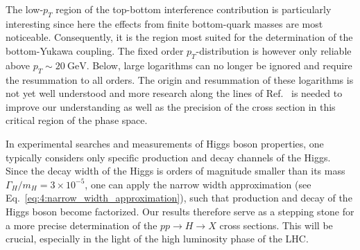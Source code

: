 The low-$p_T$ region of the top-bottom interference contribution is particularly interesting since here the effects from finite bottom-quark masses are most noticeable. Consequently, it is the region most suited for the determination of the bottom-Yukawa coupling. The fixed order $p_T$-distribution is however only reliable above $p_T \sim 20 \ \mathrm{GeV}$. Below, large logarithms can no longer be ignored and require the resummation to all orders. The origin and resummation of these logarithms is not yet well understood and more research along the lines of Ref.~\cite{Caola:2018zye, Liu:2017vkm} is needed to improve our understanding as well as the precision of the cross section in this critical region of the phase space.

In experimental searches and measurements of Higgs boson properties, one typically considers only specific production and decay channels of the Higgs. Since the decay width of the Higgs is orders of magnitude smaller than its mass $\Gamma_H /m_H = 3 \times 10^{-5}$, one can apply the narrow width approximation (see Eq.~\eqref{eq:4:narrow_width_approximation}), such that production and decay of the Higgs boson become factorized. Our results therefore serve as a stepping stone for a more precise determination of the $pp \rightarrow H \rightarrow X$ cross sections. This will be crucial, especially in the light of the high luminosity phase of the \acs{LHC}.
